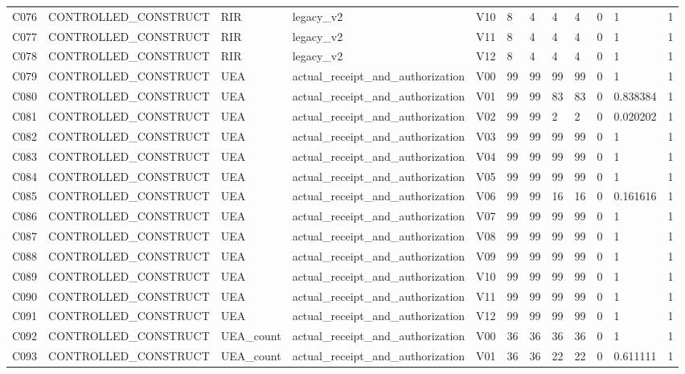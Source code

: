 \begin{longtable}{llllllllllll}
C076 & CONTROLLED\_CONSTRUCT & RIR & legacy\_v2 & V10 & 8 & 4 & 4 & 4 & 0 & 1 & 1 \\
C077 & CONTROLLED\_CONSTRUCT & RIR & legacy\_v2 & V11 & 8 & 4 & 4 & 4 & 0 & 1 & 1 \\
C078 & CONTROLLED\_CONSTRUCT & RIR & legacy\_v2 & V12 & 8 & 4 & 4 & 4 & 0 & 1 & 1 \\
C079 & CONTROLLED\_CONSTRUCT & UEA & actual\_receipt\_and\_authorization & V00 & 99 & 99 & 99 & 99 & 0 & 1 & 1 \\
C080 & CONTROLLED\_CONSTRUCT & UEA & actual\_receipt\_and\_authorization & V01 & 99 & 99 & 83 & 83 & 0 & 0.838384 & 1 \\
C081 & CONTROLLED\_CONSTRUCT & UEA & actual\_receipt\_and\_authorization & V02 & 99 & 99 & 2 & 2 & 0 & 0.020202 & 1 \\
C082 & CONTROLLED\_CONSTRUCT & UEA & actual\_receipt\_and\_authorization & V03 & 99 & 99 & 99 & 99 & 0 & 1 & 1 \\
C083 & CONTROLLED\_CONSTRUCT & UEA & actual\_receipt\_and\_authorization & V04 & 99 & 99 & 99 & 99 & 0 & 1 & 1 \\
C084 & CONTROLLED\_CONSTRUCT & UEA & actual\_receipt\_and\_authorization & V05 & 99 & 99 & 99 & 99 & 0 & 1 & 1 \\
C085 & CONTROLLED\_CONSTRUCT & UEA & actual\_receipt\_and\_authorization & V06 & 99 & 99 & 16 & 16 & 0 & 0.161616 & 1 \\
C086 & CONTROLLED\_CONSTRUCT & UEA & actual\_receipt\_and\_authorization & V07 & 99 & 99 & 99 & 99 & 0 & 1 & 1 \\
C087 & CONTROLLED\_CONSTRUCT & UEA & actual\_receipt\_and\_authorization & V08 & 99 & 99 & 99 & 99 & 0 & 1 & 1 \\
C088 & CONTROLLED\_CONSTRUCT & UEA & actual\_receipt\_and\_authorization & V09 & 99 & 99 & 99 & 99 & 0 & 1 & 1 \\
C089 & CONTROLLED\_CONSTRUCT & UEA & actual\_receipt\_and\_authorization & V10 & 99 & 99 & 99 & 99 & 0 & 1 & 1 \\
C090 & CONTROLLED\_CONSTRUCT & UEA & actual\_receipt\_and\_authorization & V11 & 99 & 99 & 99 & 99 & 0 & 1 & 1 \\
C091 & CONTROLLED\_CONSTRUCT & UEA & actual\_receipt\_and\_authorization & V12 & 99 & 99 & 99 & 99 & 0 & 1 & 1 \\
C092 & CONTROLLED\_CONSTRUCT & UEA\_count & actual\_receipt\_and\_authorization & V00 & 36 & 36 & 36 & 36 & 0 & 1 & 1 \\
C093 & CONTROLLED\_CONSTRUCT & UEA\_count & actual\_receipt\_and\_authorization & V01 & 36 & 36 & 22 & 22 & 0 & 0.611111 & 1 \\

\end{longtable}
